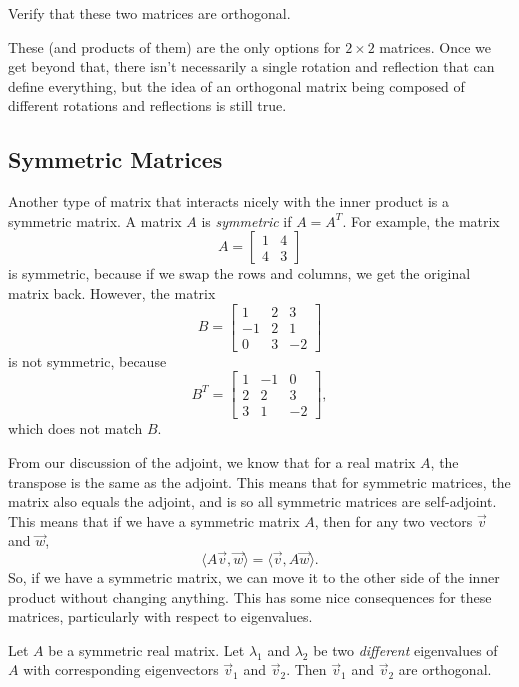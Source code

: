 \begin{exercise}
Verify that these two matrices are orthogonal.
\end{exercise} 

These (and products of them) are the only options for $2\times 2$ matrices. Once we get beyond that, there isn't necessarily a single rotation and reflection that can define everything, but the idea of an orthogonal matrix being composed of different rotations and reflections is still true.

\subsection{Symmetric Matrices}

Another type of matrix that interacts nicely with the inner product is a symmetric matrix. A matrix $A$ is \emph{symmetric} if $A = A^T$. For example, the matrix
\[ A = \begin{bmatrix} 1 & 4 \\ 4 & 3 \end{bmatrix} \] is symmetric, because if we swap the rows and columns, we get the original matrix back. However, the matrix
\[ B = \begin{bmatrix} 1 & 2 & 3 \\ -1 & 2 & 1 \\ 0 & 3 & -2 \end{bmatrix} \] is not symmetric, because
\[ B^T = \begin{bmatrix} 1 & -1 & 0 \\ 2 & 2 & 3 \\ 3 & 1 & -2 \end{bmatrix}, \] which does not match $B$. 

From our discussion of the adjoint, we know that for a real matrix $A$, the transpose is the same as the adjoint. This means that for symmetric matrices, the matrix also equals the adjoint, and is so all symmetric matrices are self-adjoint. This means that if we have a symmetric matrix $A$, then for any two vectors $\vec{v}$ and $\vec{w}$, 
\[ \langle A\vec{v}, \vec{w} \rangle = \langle \vec{v}, A \vec{w} \rangle. \] So, if we have a symmetric matrix, we can move it to the other side of the inner product without changing anything. This has some nice consequences for these matrices, particularly with respect to eigenvalues.

\begin{theorem1}{}
Let $A$ be a symmetric real matrix. Let $\lambda_1$ and $\lambda_2$ be two \emph{different} eigenvalues of $A$ with corresponding eigenvectors $\vec{v}_1$ and $\vec{v}_2$. Then $\vec{v}_1$ and $\vec{v}_2$ are orthogonal. 
\end{theorem1}

